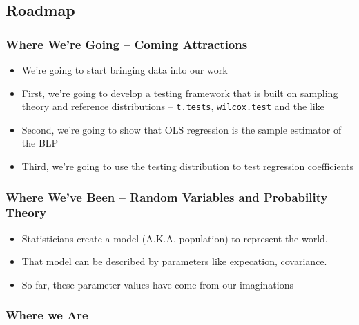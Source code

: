 \documentclass[
]{book}
\providecommand{\tightlist}{%
  \setlength{\itemsep}{0pt}\setlength{\parskip}{0pt}}
\theoremstyle{definition}
\theoremstyle{definition}
\theoremstyle{definition}
\theoremstyle{definition}
\theoremstyle{remark}
\begin{document}
\hypertarget{roadmap-2}{%
\subsection{Roadmap}\label{roadmap-2}}

\hypertarget{where-were-going-coming-attractions}{%
\subsubsection{Where We're Going -- Coming Attractions}\label{where-were-going-coming-attractions}}

\begin{itemize}
\tightlist
\item
  We're going to start bringing data into our work
\item
  First, we're going to develop a testing framework that is built on sampling theory and reference distributions -- \texttt{t.tests}, \texttt{wilcox.test} and the like
\item
  Second, we're going to show that OLS regression is the sample estimator of the BLP
\item
  Third, we're going to use the testing distribution to test regression coefficients
\end{itemize}

\hypertarget{where-weve-been-random-variables-and-probability-theory}{%
\subsubsection{Where We've Been -- Random Variables and Probability Theory}\label{where-weve-been-random-variables-and-probability-theory}}

\begin{itemize}
\tightlist
\item
  Statisticians create a model (A.K.A. population) to represent the world.
\item
  That model can be described by parameters like expecation, covariance.
\item
  So far, these parameter values have come from our imaginations
\end{itemize}

\hypertarget{where-we-are}{%
\subsubsection{Where we Are}\label{where-we-are}}
\end{document}
